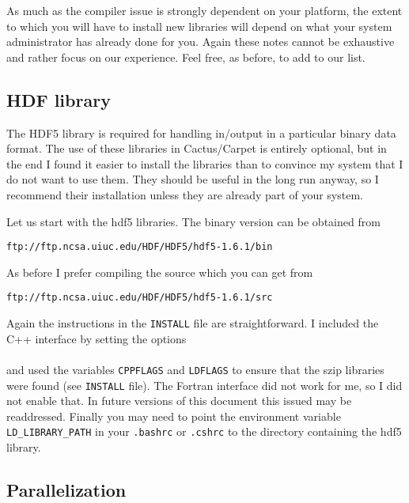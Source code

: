 \documentclass[11pt]{article}
\numberwithin{equation}{section}
\begin{document}
As much as the compiler issue is strongly dependent on your platform,
the extent to which you will have to install new libraries will depend on
what your system administrator has already done for you. Again these notes
cannot be exhaustive and rather focus on our experience. Feel free,
as before, to add to our list.

\subsection{HDF library}

The HDF5 library is required for handling in/output in
a particular binary data
format. The use of these libraries in Cactus/Carpet is entirely optional,
but in the end I found it easier to install the libraries than to
convince my system that I do not want to use them. They should be useful
in the long run anyway, so I recommend their installation unless
they are already part of your system.

Let us start with the hdf5 libraries. The binary version can be obtained from
%
\begin{center}
  {\tt ftp://ftp.ncsa.uiuc.edu/HDF/HDF5/hdf5-1.6.1/bin}
\end{center}
%
As before I prefer compiling the source which you can get from
%
\begin{center}
  {\tt ftp://ftp.ncsa.uiuc.edu/HDF/HDF5/hdf5-1.6.1/src}
\end{center}
%
Again the instructions in the {\tt INSTALL} file are straightforward. I
included the C++ interface by setting the options\\

\hspace{1cm}{\tt ./configure --enable-cxx}\\

and used the variables {\tt CPPFLAGS} and {\tt LDFLAGS} to ensure that the
szip libraries were found (see {\tt INSTALL} file). The Fortran interface
did not work for me, so I did not enable that. In future versions of
this document this issued may be readdressed. Finally you may need to point
the environment variable {\tt LD\_LIBRARY\_PATH} in your {\tt .bashrc}
or {\tt .cshrc} to the directory containing the hdf5 library.\\


\subsection{Parallelization}
\end{document}
